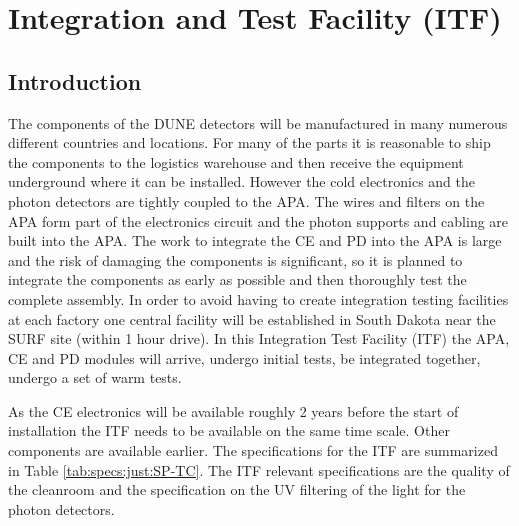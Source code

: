 \section{Integration and Test Facility (ITF)}
\label{sec:fdsp-tc-itf}

\subsection{Introduction}
\label{sec:fdsp-tc-itf-intro}

The components of the DUNE detectors will be manufactured in many numerous different countries and locations. 
For many of the parts it is reasonable to ship the components to the logistics warehouse and then receive the equipment underground where it can be installed. 
However the  cold electronics and the photon detectors are tightly coupled to the APA. 
The wires and filters on the APA form part of the electronics circuit and the photon supports and cabling are built into the APA. 
The work to integrate the CE and PD into the APA is large and the risk of damaging the components is significant, so it is planned to integrate the components as early as possible and then thoroughly test the complete assembly.
In order to avoid having to create integration testing facilities at each factory one central facility will be established in South Dakota near the SURF site  (within 1 hour drive). 
In this Integration Test Facility (ITF) the APA, CE and PD modules will arrive, undergo initial tests, be integrated together, undergo a set of warm tests. 

As the CE electronics will be available roughly 2 years before the start of installation the ITF needs to be available on the same time scale. Other components are available earlier. 
The specifications for the ITF are summarized in Table \ref{tab:specs:just:SP-TC}.  
The ITF relevant specifications are the quality of the cleanroom and the specification on the UV filtering of the light for the photon detectors.






